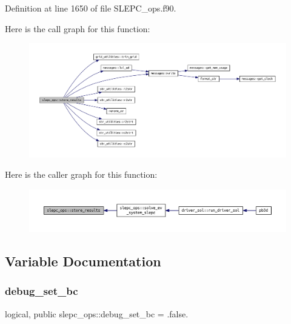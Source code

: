 Definition at line 1650 of file S\+L\+E\+P\+C\+\_\+ops.\+f90.

Here is the call graph for this function\+:
\nopagebreak
\begin{figure}[H]
\begin{center}
\leavevmode
\includegraphics[width=350pt]{namespaceslepc__ops_a66241540803bca208b2f3bd6b0448491_cgraph}
\end{center}
\end{figure}
Here is the caller graph for this function\+:
\nopagebreak
\begin{figure}[H]
\begin{center}
\leavevmode
\includegraphics[width=350pt]{namespaceslepc__ops_a66241540803bca208b2f3bd6b0448491_icgraph}
\end{center}
\end{figure}


\subsection{Variable Documentation}
\mbox{\label{namespaceslepc__ops_ad57b5fd70608c1b97454963bdd1c4f5b}} 
\subsubsection{\texorpdfstring{debug\+\_\+set\+\_\+bc}{debug\_set\_bc}}
{\footnotesize\ttfamily logical, public slepc\+\_\+ops\+::debug\+\_\+set\+\_\+bc = .false.}



